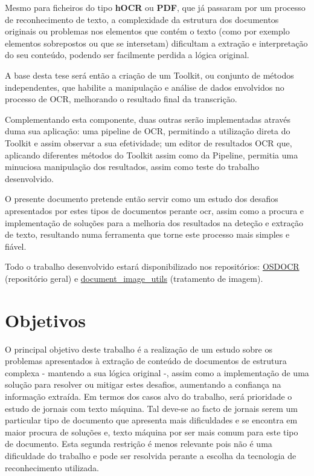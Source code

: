 Mesmo para ficheiros do tipo \textbf{hOCR} ou \textbf{PDF}, que já passaram por um processo de reconhecimento de texto, a complexidade da estrutura dos documentos originais ou problemas nos elementos que contém o texto (como por exemplo elementos sobrepostos ou que se intersetam) dificultam a extração e interpretação do seu conteúdo, podendo ser facilmente perdida a lógica original.

A base desta tese será então a criação de um Toolkit, ou conjunto de métodos independentes, que habilite a manipulação e análise de dados envolvidos no processo de OCR, melhorando o resultado final da transcrição.

Complementando esta componente, duas outras serão implementadas através duma sua aplicação: uma pipeline de OCR, permitindo a utilização direta do Toolkit e assim observar a sua efetividade; um editor de resultados OCR que, aplicando diferentes métodos do Toolkit assim como da Pipeline, permitia uma minuciosa manipulação dos resultados, assim como teste do trabalho desenvolvido. 

O presente documento pretende então servir como um estudo dos desafios apresentados por estes tipos de documentos perante \acrshort{ocr}, assim como a procura e implementação de soluções para a melhoria dos resultados na deteção  e extração de texto, resultando numa ferramenta que torne este processo mais simples e fiável. 

Todo o trabalho desenvolvido estará disponibilizado nos repositórios: \href{https://github.com/brazafonso/OCR-old_documents}{OSDOCR} (repositório geral) e \href{https://github.com/brazafonso/document_image_processing}{document\_image\_utils} (tratamento de imagem).

\section{Objetivos}
\label{section_objetivos}

O principal objetivo deste trabalho é a realização de um estudo sobre os problemas apresentados à extração de conteúdo de documentos de estrutura complexa - mantendo 
a sua lógica original -, assim como a implementação de uma solução para resolver ou mitigar estes desafios, aumentando a confiança na informação extraída. 
Em termos dos casos alvo do trabalho, será prioridade o estudo de jornais com texto máquina. Tal deve-se ao facto de jornais serem um particular tipo de documento que apresenta mais dificuldades e se encontra em maior procura de soluções e, texto máquina por ser mais comum para este tipo de documento. Esta segunda restrição é menos relevante pois não é uma dificuldade do trabalho e pode ser resolvida perante a escolha da tecnologia de reconhecimento utilizada.

